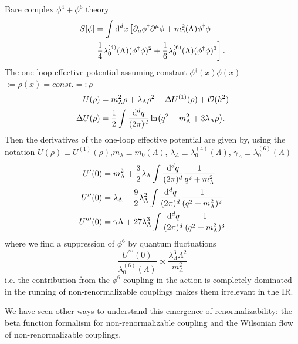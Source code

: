 \begin{mybox}{}
	Bare complex $\phi^4+\phi^6$ theory
	\begin{align}
	S[\phi] &= \int \mathrm{d}^d x \left[\partial_\mu \phi^\dagger \partial^\mu \phi + m^2_0(\Lambda) \phi^\dagger \phi \right.\\
	&\left.\frac{1}{4} \lambda^{(4)}_0(\Lambda) (\phi^\dagger \phi)^2 + \frac{1}{6} \lambda^{(6)}_0(\Lambda)(\phi^\dagger \phi)^3 \right] \nonumber.
	\end{align}
	The one-loop effective potential assuming constant $\phi^\dagger(x)\phi(x)$$:=\rho(x)=const.=:\rho$
	\begin{align}
	U(\rho) &= m^2_\Lambda \rho + \lambda_\Lambda \rho^2 + \Delta U^{(1)}(\rho) + \mathcal{O}(\hbar^2)\\
	\Delta U(\rho) &= \frac{1}{2} \int \frac{\mathrm{d}^d q}{(2\pi)^d} \ln(q^2+m^2_\Lambda+3\lambda_\Lambda \rho).
	\end{align}
	Then the derivatives of the one-loop effective potential are given by, using the notation $U(\rho)\equiv U^{(1)}(\rho)$,$m_\lambda\equiv m_0(\Lambda)$, $\lambda_\Lambda\equiv \lambda^{(4)}_0(\Lambda)$, $\gamma_\Lambda\equiv \lambda^{(6)}_0(\Lambda)$
	\begin{align}
	U^\prime(0) &= m^2_\Lambda + \frac{3}{2} \lambda_\Lambda \int \frac{\mathrm{d}^d q}{(2 \pi)^d} \frac{1}{q^2+m^2_\Lambda}\\
	U^{\prime \prime}(0) &= \lambda_\Lambda - \frac{9}{2} \lambda^2_\Lambda \int \frac{\mathrm{d}^d q}{(2 \pi)^d} \frac{1}{(q^2+m^2_\Lambda)^2}\\
	U^{\prime \prime \prime}(0) &= \gamma\Lambda + 27 \lambda^3_\Lambda \int \frac{\mathrm{d}^d q}{(2 \pi)^d} \frac{1}{(q^2+m^2_\Lambda)^3}
	\end{align}
	where we find a suppression of $\phi^6$ by quantum fluctuations
	\begin{equation}
	\frac{U^{\prime \prime \prime}(0)}{\lambda^{(6)}_0(\Lambda)} \propto \frac{\lambda^3_\Lambda \Lambda^2}{m^2_\Lambda}
	\end{equation}
	i.e. the contribution from the $\phi^6$ coupling in the action is completely dominated in the running of non-renormalizable couplings makes them irrelevant in the IR.
\end{mybox}
We have seen other ways to understand this emergence of renormalizability: the beta function formalism for non-renormalizable coupling and the Wilsonian flow of non-renormalizable couplings.






